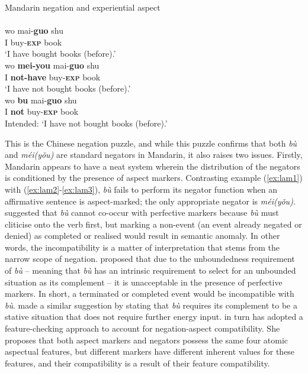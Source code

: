 \documentclass[output=paper]{langscibook}
\begin{document}
\ea Mandarin negation and experiential aspect \label{ex:lam3}\\
   \label{ex:lam3a}\\
    \gll wo	mai-\textbf{guo} shu\\
	I buy-\textbf{\textsc{exp}} book\\
	\glt `I have bought books (before).'
   \label{ex:lam3b}\\
    \gll wo	\textbf{mei-you} mai-\textbf{guo} shu\\
	I \textbf{not-have} buy-\textbf{\textsc{exp}} book\\
	\glt `I have not bought books (before).'
   \label{ex:lam3c}\\
  \gll *wo \textbf{bu} mai-\textbf{guo} shu \\
  	I \textbf{not} buy-\textbf{\textsc{exp}} book\\
  	\glt Intended: `I have not bought books (before).'
\z \z

This is the Chinese negation puzzle, and while this puzzle confirms that both \textit{bù} and \textit{méi(yǒu)} are standard negators in Mandarin, it also raises two issues. Firstly, Mandarin appears to have a neat system wherein the distribution of the negators is conditioned by the presence of aspect markers. Contrasting example (\ref{ex:lam1}) with (\ref{ex:lam2}-\ref{ex:lam3}), \textit{bù} fails to perform its negator function when an affirmative sentence is aspect-marked; the only appropriate negator is \textit{méi(yǒu)}. \cite{Huang1988} suggested that \textit{bù} cannot co-occur with perfective markers because \textit{bù} must cliticise onto the verb first, but marking a non-event (an event already negated or denied) as completed or realised would result in semantic anomaly. In other words, the incompatibility is a matter of interpretation that stems from the narrow scope of negation. \cite{Ernst1995} proposed that due to the unboundedness requirement of \textit{bù} – meaning that \textit{bù} has an intrinsic requirement to select for an unbounded situation as its complement – it is unacceptable in the presence of perfective markers. In short, a terminated or completed event would be incompatible with \textit{bù}. \cite{Lin2003} made a similar suggestion by stating that \textit{bù} requires its complement to be a stative situation that does not require further energy input. \cite{Li2007} in turn has adopted a feature-checking approach to account for negation-aspect compatibility. She proposes that both aspect markers and negators possess the same four atomic aspectual features, but different markers have different inherent values for these features, and their compatibility is a result of their feature compatibility. 
\end{document}

